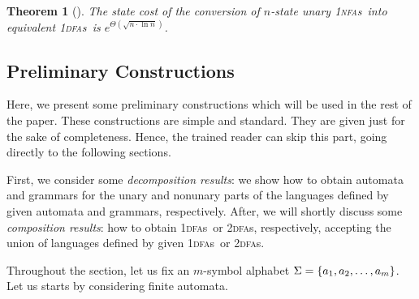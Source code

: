 \documentclass[11pt]{article}
\newcommand*{\tw}{\textsc{2}}
\newcommand*{\twdfas}{\tw\textsc{dfa}s}
\newcommand*{\ow}{\textsc{1}}
\newcommand*{\owdfas}{\ow\textsc{dfa}s}
\newcommand*{\ownfas}{\ow\textsc{nfa}s}
\newtheorem{theorem}{Theorem}[section]
\begin{document}
\begin{theorem}[\cite{Chrobak1986}]\label{thm:Chrobak86}
	The state cost of the conversion of $n$-state unary \ownfas\ into equivalent \owdfas\ is $e^{\Theta(\sqrt{n \cdot \ln n})}$.
\end{theorem}


\subsection{Preliminary Constructions}
	\label{sec:constructions}


Here, we present some preliminary constructions which will
be used in the rest of the paper. These constructions are simple and standard.
They are given just for the sake of completeness. Hence, the trained reader
can skip this part, going directly to the following sections.

First, we consider some \emph{decomposition results}: we show how to obtain automata and grammars 
for the unary and nonunary parts of the languages defined by given automata and grammars, respectively.
After, we will shortly  discuss some \emph{composition results}: 
how to obtain \owdfas\ or \twdfas, respectively,
accepting the union of languages defined by  given \owdfas\ or \twdfas.

Throughout the section, let us fix an $m$-symbol alphabet  $\Sigma=\{a_1, a_2,\linebreak \ldots,a_m\}$.
Let us starts by considering finite automata.
\end{document}
